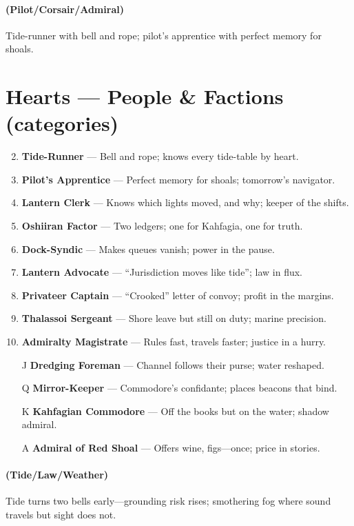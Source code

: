 \paragraph*{(Pilot/Corsair/Admiral)} Tide-runner with bell and rope; pilot's apprentice with perfect memory for shoals.

\section*{Hearts --- People \& Factions (categories)}
\label{sec:kahfagia-people}
\begin{enumerate}
\setcounter{enumi}{1}
\item \textbf{Tide-Runner} --- Bell and rope; knows every tide-table by heart.
\item \textbf{Pilot's Apprentice} --- Perfect memory for shoals; tomorrow's navigator.
\item \textbf{Lantern Clerk} --- Knows which lights moved, and why; keeper of the shifts.
\item \textbf{Oshiiran Factor} --- Two ledgers; one for Kahfagia, one for truth.
\item \textbf{Dock-Syndic} --- Makes queues vanish; power in the pause.
\item \textbf{Lantern Advocate} --- ``Jurisdiction moves like tide''; law in flux.
\item \textbf{Privateer Captain} --- ``Crooked'' letter of convoy; profit in the margins.
\item \textbf{Thalassoi Sergeant} --- Shore leave but still on duty; marine precision.
\item \textbf{Admiralty Magistrate} --- Rules fast, travels faster; justice in a hurry.
\item[J] \textbf{Dredging Foreman} --- Channel follows their purse; water reshaped.
\item[Q] \textbf{Mirror-Keeper} --- Commodore's confidante; places beacons that bind.
\item[K] \textbf{Kahfagian Commodore} --- Off the books but on the water; shadow admiral.
\item[A] \textbf{Admiral of Red Shoal} --- Offers wine, figs---once; price in stories.
\end{enumerate}

\paragraph*{(Tide/Law/Weather)} Tide turns two bells early---grounding risk rises; smothering fog where sound travels but sight does not.

